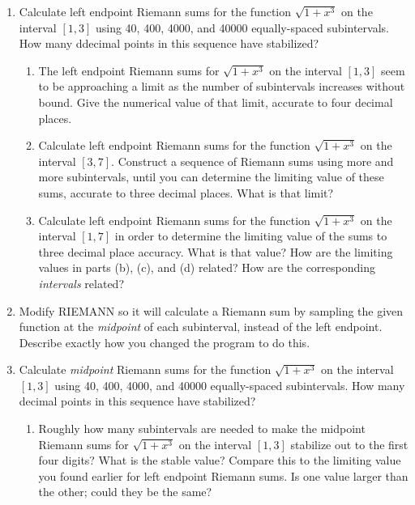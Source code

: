 \begin{enumerate}
\item \label{left sums} Calculate left endpoint Riemann sums for the
function $\sqrt{1 + x^3}$ on the interval $[1, 3]$ using 40, 400,
4000, and 40000 equally-spaced subintervals.  How many ddecimal points
in this sequence have stabilized?

  \begin{enumerate}
  \item The left endpoint Riemann sums for $\sqrt{1 + x^3}$ on the interval $[1, 3]$ seem to be approaching a limit as the number of subintervals increases without bound.  Give the numerical value of that limit, accurate to four decimal places.

  \item Calculate left endpoint Riemann sums for the function $\sqrt{1 + x^3}$ on the interval $[3, 7]$.  Construct a sequence of Riemann sums using more and more subintervals, until you can determine the limiting value of these sums, accurate to three decimal places.  What is that limit?

  \item Calculate left endpoint Riemann sums for the function $\sqrt{1 + x^3}$ on the interval $[1, 7]$ in order to determine the limiting value of the sums to three decimal place accuracy.  What is that value?  How are the limiting values in parts (b), (c), and (d) related?  How are the corresponding {\em intervals\/} related?


\end{enumerate}
\item Modify RIEMANN so it will calculate a Riemann sum by sampling the given function at the {\em midpoint\/} of each subinterval, instead of the left endpoint.  Describe exactly how you changed the program to do this.


\item Calculate {\em midpoint\/} Riemann sums for the function $\sqrt{1 + x^3}$ on the interval $[1, 3]$ using 40, 400, 4000, and 40000 equally-spaced subintervals.  How many decimal points in this sequence have stabilized?

  \begin{enumerate}
  \item Roughly how many subintervals are needed to make the midpoint Riemann sums for $\sqrt{1 + x^3}$ on the interval $[1, 3]$ stabilize out to the first four digits?  What is the stable value?  Compare this to the limiting value you found earlier for left endpoint Riemann sums.  Is one value larger than the other; could they be the same?


\end{enumerate}
\end{enumerate}
